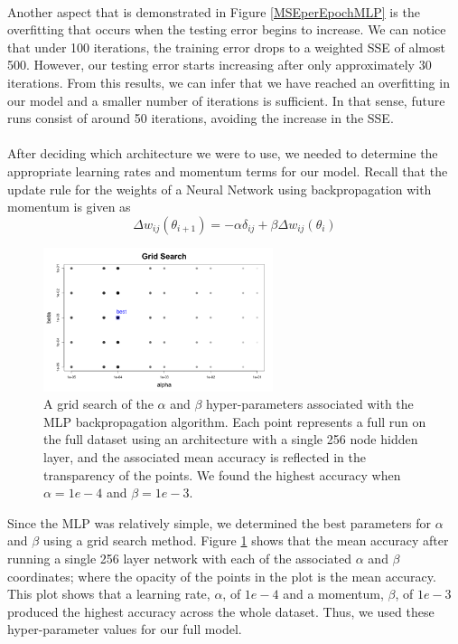 \documentclass[11.5pt]{article}
\newcounter{Figure}
\newcounter{graphics}
\begin{document}
\paragraph{} Another aspect that is demonstrated in Figure \ref{MSEperEpochMLP} is the overfitting that occurs when the testing error begins to increase. We can notice that under 100 iterations, the training error drops to a weighted SSE of almost 500. However, our testing error starts increasing after only approximately 30 iterations. From this results, we can infer that we have reached an overfitting in our model and a smaller number of iterations is sufficient. In that sense, future runs consist of around 50 iterations, avoiding the increase in the SSE.

\paragraph{} After deciding which architecture we were to use, we needed to determine the appropriate learning rates and momentum terms for our model. Recall that the update rule for the weights of a Neural Network using backpropagation with momentum is given as 
$$ \Delta w_{ij} (\theta_{i+1}) = -\alpha \delta_{ij}  + \beta \Delta w_{ij} (\theta_i)$$


  \begin{figure}[h!]
\centerline{\includegraphics[width=0.6\textwidth]{report_mlp/GridSearch.png}}
  \caption{\small A grid search of the $\alpha$ and $\beta$ hyper-parameters associated with the MLP backpropagation algorithm. Each point represents a full run on the full dataset using an architecture with a single 256 node hidden layer, and the associated mean accuracy is reflected in the transparency of the points. We found the highest accuracy when $\alpha = 1e-4$ and $\beta =1e-3$. }
\label{GridSearch}
\end{figure}

Since the MLP was relatively simple, we determined the best parameters for $\alpha$ and $\beta$ using a grid search method. Figure \ref{GridSearch} shows that the mean accuracy after running a single 256 layer network with each of the associated $\alpha$ and $\beta$ coordinates; where the opacity of the points in the plot is the mean accuracy. This plot shows that a learning rate, $\alpha$, of $1e-4$ and a momentum, $\beta$, of $1e-3$ produced the highest accuracy across the whole dataset. Thus, we used these hyper-parameter values for our full model. 
\end{document}
